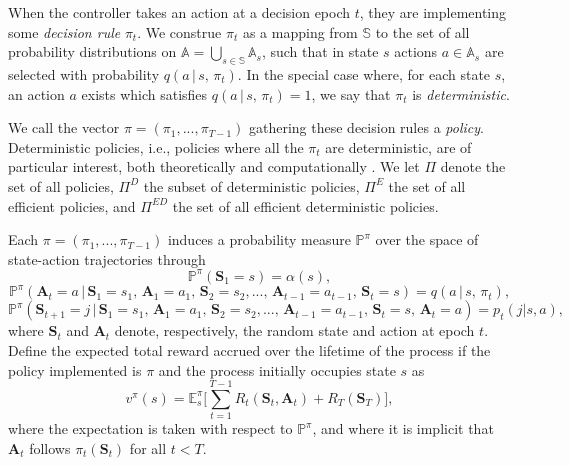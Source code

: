 \documentclass{article}
\theoremstyle{definition}
\numberwithin{equation}{section}
\begin{document}
{When the controller takes an action at a decision epoch $t$, they are implementing some \textit{decision rule} $\pi_t$. We construe $\pi_t$ as a mapping from $\mathbb{S}$ to the set of all probability distributions on $\mathbb A = \bigcup_{s \in \mathbb{S}} \mathbb{A}_s$, such that in state $s$ actions $a \in \mathbb{A}_s$ are selected with probability $q(a \,|\, s,\, \pi_t)$. 
In the special case where, for each state $s$, an action $a$ exists which satisfies 
$q(a \,|\, s,\, \pi_t) = 1$, we say that $\pi_t$ is {\it deterministic}.

We call the vector $\pi = (\pi_1, ..., \pi_{T-1})$ 
gathering these decision rules a %
\textit{policy}. Deterministic policies, i.e., policies where all the $\pi_t$ are deterministic, are of particular interest, both theoretically and computationally \cite{16}. We let $\Pi$ denote the set of all %
policies, $\Pi^{D}$ the subset of deterministic policies, $\Pi^E$ the set of all efficient policies, and $\Pi^{ED}$ the set of all efficient
deterministic policies.

Each $\pi = (\pi_1, ..., \pi_{T-1})$ induces a probability measure $\mathbb{P}^{\pi}$ over the space of state-action trajectories through 
\begin{equation*}
\mathbb{P}^{\pi}(\textbf{S}_1 = s) = \alpha(s),
\end{equation*}
\begin{equation*}
\mathbb{P}^{\pi}(\textbf{A}_t = a \,|\, \textbf{S}_1 = s_1,\, \textbf{A}_1 = a_1,\, \textbf{S}_2 = s_2, ...,\, \textbf{A}_{t-1} = a_{t-1},\, \textbf{S}_t = s) = q(a\,|\,s,\, \pi_t),
\end{equation*}
\begin{equation*}
\mathbb{P}^{\pi}(\textbf{S}_{t+1} = j \,|\, \textbf{S}_1 = s_1,\, \textbf{A}_1 = a_1,\, \textbf{S}_2 = s_2, ...,\, \textbf{A}_{t-1} = a_{t-1},\, \textbf{S}_t = s,\, \textbf{A}_t = a) = p_t(j | s, a),
\end{equation*}
where $\textbf{S}_t$ and $\textbf{A}_t$ denote, respectively, the random state and action at epoch $t$. Define the expected total reward accrued over the lifetime of the process if the policy implemented is $\pi$ and the process initially occupies state $s$ as 
\begin{equation*}
v^{\pi}(s) = \mathbb{E}_{s}^{\pi}\biggl[\sum_{t = 1}^{T-1}R_t(\textbf{S}_t, \textbf{A}_t) + R_T(\textbf{S}_T)\biggr],
\end{equation*} 
where the expectation is taken with respect to $\mathbb{P}^{\pi}$, and where it is implicit that $\textbf{A}_t$ follows $\pi_t(\textbf{S}_t)$ for all $t < T$. 


}
\end{document}
